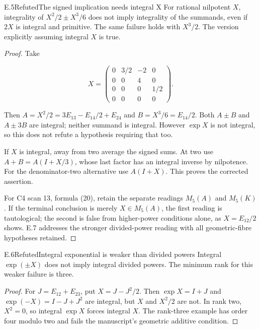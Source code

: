 \begin{statement}{E.5}{Refuted}{The signed implication needs integral X}
For rational nilpotent $X$, integrality of
$X^2/2\pm X^3/6$ does not imply integrality of the summands,
even if $2X$ is integral and primitive.
The same failure holds with $X^3/2$.
The version explicitly assuming integral $X$ is true.
\end{statement}
\begin{proof}
Take

$$
X=\begin{pmatrix}0&3/2&-2&0\\0&0&4&0\\0&0&0&1/2\\0&0&0&0\end{pmatrix}.
$$

Then $A=X^2/2=3E_{13}-E_{14}/2+E_{24}$ and
$B=X^3/6=E_{14}/2$.
Both $A\pm B$ and $A\pm3B$ are integral; neither summand
is integral. However $\exp X$ is not integral, so this
does not refute a hypothesis requiring that too.

If $X$ is integral, away from two average the signed
sums. At two use $A+B=A(I+X/3)$, whose last factor has
an integral inverse by nilpotence.
For the denominator-two alternative use $A(I+X)$.
This proves the corrected assertion.

For C4 scan 13, formula (20), retain the separate readings
$M_5(A)$ and $M_5(K)$.
If the terminal conclusion is merely $X\in M_5(A)$,
the first reading is tautological; the second is false
from higher-power conditions alone, as $X=E_{12}/2$
shows. E.7 addresses the stronger divided-power reading
with all geometric-fibre hypotheses retained.
\end{proof}

\begin{statement}{E.6}{Refuted}{Integral exponential is weaker than divided powers}
Integral $\exp(\pm X)$ does not imply integral divided
powers. The minimum rank for this weaker failure is three.
\end{statement}
\begin{proof}
For $J=E_{12}+E_{23}$, put $X=J-J^2/2$.
Then $\exp X=I+J$ and $\exp(-X)=I-J+J^2$ are integral,
but $X$ and $X^2/2$ are not.
In rank two, $X^2=0$, so integral $\exp X$ forces integral
$X$. The rank-three example has order four modulo two
and fails the manuscript's geometric additive condition.
\end{proof}

